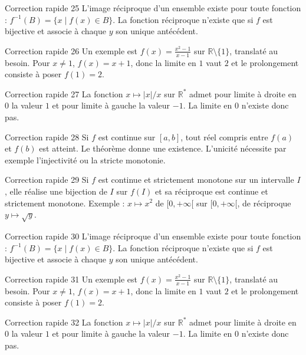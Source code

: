 \documentclass[11pt,a4paper]{article}
\newcommand{\R}{\mathbb{R}}
\begin{document}
\begin{corrbox}{Correction rapide 25}
L'image réciproque d'un ensemble existe pour toute fonction : $f^{-1}(B)=\{x\mid f(x)\in B\}$. La fonction réciproque n'existe que si $f$ est bijective et associe à chaque $y$ son unique antécédent.
\end{corrbox}
\begin{corrbox}{Correction rapide 26}
Un exemple est $f(x)=\frac{x^2-1}{x-1}$ sur $\R\setminus\{1\}$, translaté au besoin. Pour $x\neq1$, $f(x)=x+1$, donc la limite en $1$ vaut $2$ et le prolongement consiste à poser $f(1)=2$.
\end{corrbox}
\begin{corrbox}{Correction rapide 27}
La fonction $x\mapsto |x|/x$ sur $\R^*$ admet pour limite à droite en $0$ la valeur $1$ et pour limite à gauche la valeur $-1$. La limite en $0$ n'existe donc pas.
\end{corrbox}
\begin{corrbox}{Correction rapide 28}
Si $f$ est continue sur $[a,b]$, tout réel compris entre $f(a)$ et $f(b)$ est atteint. Le théorème donne une existence. L'unicité nécessite par exemple l'injectivité ou la stricte monotonie.
\end{corrbox}
\begin{corrbox}{Correction rapide 29}
Si $f$ est continue et strictement monotone sur un intervalle $I$, elle réalise une bijection de $I$ sur $f(I)$ et sa réciproque est continue et strictement monotone. Exemple : $x\mapsto x^2$ de $[0,+\infty[$ sur $[0,+\infty[$, de réciproque $y\mapsto\sqrt y$.
\end{corrbox}
\begin{corrbox}{Correction rapide 30}
L'image réciproque d'un ensemble existe pour toute fonction : $f^{-1}(B)=\{x\mid f(x)\in B\}$. La fonction réciproque n'existe que si $f$ est bijective et associe à chaque $y$ son unique antécédent.
\end{corrbox}
\begin{corrbox}{Correction rapide 31}
Un exemple est $f(x)=\frac{x^2-1}{x-1}$ sur $\R\setminus\{1\}$, translaté au besoin. Pour $x\neq1$, $f(x)=x+1$, donc la limite en $1$ vaut $2$ et le prolongement consiste à poser $f(1)=2$.
\end{corrbox}
\begin{corrbox}{Correction rapide 32}
La fonction $x\mapsto |x|/x$ sur $\R^*$ admet pour limite à droite en $0$ la valeur $1$ et pour limite à gauche la valeur $-1$. La limite en $0$ n'existe donc pas.
\end{corrbox}
\end{document}

